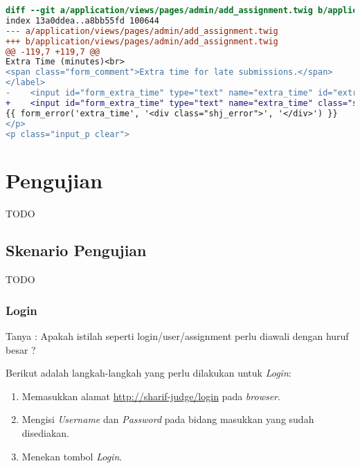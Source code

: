 \begin{lstlisting}[language=diff, caption=Perubahan untuk mematuhi kriteria 4.1.1, label=lst_4.1.1, basicstyle=\ttfamily, frame=single,
columns=fullflexible, keepspaces=true, breaklines=true]
diff --git a/application/views/pages/admin/add_assignment.twig b/application/views/pages/admin/add_assignment.twig
index 13a0ddea..a8bb55fd 100644
--- a/application/views/pages/admin/add_assignment.twig
+++ b/application/views/pages/admin/add_assignment.twig
@@ -119,7 +119,7 @@
Extra Time (minutes)<br>
<span class="form_comment">Extra time for late submissions.</span>
</label>
-    <input id="form_extra_time" type="text" name="extra_time" id="extra_time" class="sharif_input medium" value="{{ edit ? edit_assignment.extra_time|extra_time_formatter : set_value('extra_time') }}" />
+    <input id="form_extra_time" type="text" name="extra_time" class="sharif_input medium" value="{{ edit ? edit_assignment.extra_time|extra_time_formatter : set_value('extra_time') }}" />
{{ form_error('extra_time', '<div class="shj_error">', '</div>') }}
</p>
<p class="input_p clear">
\end{lstlisting}

\section{Pengujian}
\label{sec:pengujian}
TODO

\subsection{Skenario Pengujian}
\label{subsec:skenario_pengujian}
TODO

\subsubsection{Login}
\label{subsubsec:skenario_login}
Tanya : Apakah istilah seperti login/user/assignment perlu diawali dengan huruf besar ?

Berikut adalah langkah-langkah yang perlu dilakukan untuk \textit{Login}:

\begin{enumerate}
	\item Memasukkan alamat \url{http://sharif-judge/login} pada \textit{browser}.
	\item Mengisi \textit{Username} dan \textit{Password} pada bidang masukkan yang sudah disediakan.
	\item Menekan tombol \textit{Login}.
\end{enumerate}

